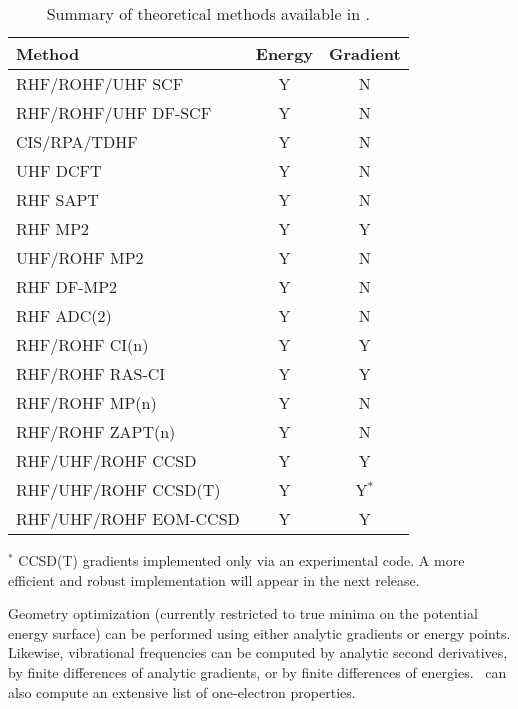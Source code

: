 \begin{table}
\caption{Summary of theoretical methods available in \PSIfour.} \label{table:methods}
\parsep 10pt
\begin{center}
\begin{tabular}{lcc} \hline\hline
Method                & Energy & Gradient \\ \hline
RHF/ROHF/UHF SCF     & Y & N \\
RHF/ROHF/UHF DF-SCF   & Y & N \\
CIS/RPA/TDHF          & Y & N \\
UHF DCFT              & Y & N \\
RHF SAPT              & Y & N \\
RHF MP2               & Y & Y \\
UHF/ROHF MP2          & Y & N \\
RHF DF-MP2            & Y & N \\
RHF ADC(2)            & Y & N \\
RHF/ROHF CI(n)        & Y & Y \\
RHF/ROHF RAS-CI       & Y & Y \\
RHF/ROHF MP(n)        & Y & N \\
RHF/ROHF ZAPT(n)      & Y & N \\
RHF/UHF/ROHF CCSD     & Y & Y \\
RHF/UHF/ROHF CCSD(T)  & Y & Y$^*$ \\
RHF/UHF/ROHF EOM-CCSD & Y & Y \\
\hline\hline
\end{tabular}
\end{center}
\footnotesize{$^*$ CCSD(T) gradients implemented only via an experimental
code.  A more efficient and robust implementation will appear in the next
release.}
\end{table}
Geometry optimization (currently restricted to true minima on the potential
energy surface) can be performed using either analytic gradients
or energy points.  Likewise, vibrational frequencies can be 
computed by analytic second derivatives, by finite
differences of analytic gradients, or by finite differences of energies.
\PSIfour\ can also compute an extensive list of one-electron properties.

